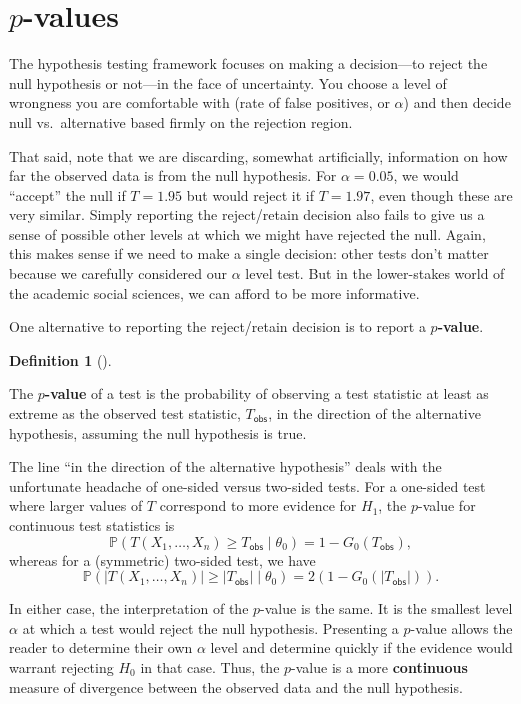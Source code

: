 \documentclass[
  13pt,
  letterpaper,
  DIV=11,
  numbers=noendperiod]{scrreprt}
\renewcommand{\P}{\mathbb{P}}
\theoremstyle{plain}
\theoremstyle{plain}
\theoremstyle{definition}
\newtheorem{definition}{Definition}[chapter]
\theoremstyle{definition}
\theoremstyle{remark}
\begin{document}
\section{\texorpdfstring{\(p\)-values}{p-values}}\label{sec-p-values}

The hypothesis testing framework focuses on making a decision---to
reject the null hypothesis or not---in the face of uncertainty. You
choose a level of wrongness you are comfortable with (rate of false
positives, or \(\alpha\)) and then decide null vs.~alternative based
firmly on the rejection region.

That said, note that we are discarding, somewhat artificially,
information on how far the observed data is from the null hypothesis.
For \(\alpha = 0.05\), we would ``accept'' the null if \(T = 1.95\) but
would reject it if \(T = 1.97\), even though these are very similar.
Simply reporting the reject/retain decision also fails to give us a
sense of possible other levels at which we might have rejected the null.
Again, this makes sense if we need to make a single decision: other
tests don't matter because we carefully considered our \(\alpha\) level
test. But in the lower-stakes world of the academic social sciences, we
can afford to be more informative.

One alternative to reporting the reject/retain decision is to report a
\textbf{\(p\)-value}.

\begin{definition}[]\protect\hypertarget{def-p-value}{}\label{def-p-value}

The \textbf{\(p\)-value} of a test is the probability of observing a
test statistic at least as extreme as the observed test statistic,
\(T_{\textsf{obs}}\), in the direction of the alternative hypothesis,
assuming the null hypothesis is true.

\end{definition}

The line ``in the direction of the alternative hypothesis'' deals with
the unfortunate headache of one-sided versus two-sided tests. For a
one-sided test where larger values of \(T\) correspond to more evidence
for \(H_1\), the \(p\)-value for continuous test statistics is \[
\P(T(X_1,\ldots,X_n) \geq T_{\textsf{obs}} \mid \theta_0) = 1 - G_0(T_{\textsf{obs}}),
\] whereas for a (symmetric) two-sided test, we have \[ 
\P(|T(X_1, \ldots, X_n)| \geq |T_{\textsf{obs}}| \mid \theta_0) = 2(1 - G_0(|T_{\textsf{obs}}|)).
\]

In either case, the interpretation of the \(p\)-value is the same. It is
the smallest level \(\alpha\) at which a test would reject the null
hypothesis. Presenting a \(p\)-value allows the reader to determine
their own \(\alpha\) level and determine quickly if the evidence would
warrant rejecting \(H_0\) in that case. Thus, the \(p\)-value is a more
\textbf{continuous} measure of divergence between the observed data and
the null hypothesis.
\end{document}
